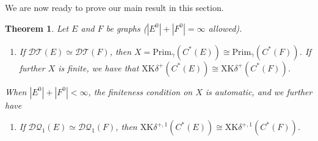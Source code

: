 \documentclass[12pt]{amsbook}%
\newcommand{\lt}{\operatorname{rt}}
\newtheorem{theor}{Theorem}[section]
\theoremstyle{defin}
\theoremstyle{remark}
\numberwithin{equation}{chapter}
\numberwithin{theor}{section}
\newcommand{\ZZ}{\mathbb{Z}}
\newcommand{\DT}{\mathcal{DT}}
\newcommand{\DQp}{\mathcal{DQ}_1}
\begin{document}
We are now ready to prove our main result in this section.

\begin{theor}\label{thm:graded-kthy-XKdelta}
Let $E$ and $F$ be graphs ($|E^0|+|F^0|=\infty$ allowed).
\begin{enumerate}[(1)]
\item If 
$\DT(E)\simeq \DT(F)$, 
then $X =  \mathrm{Prim}_\gamma ( C^*(E)) \cong \mathrm{Prim}_\gamma ( C^*(F))$. If further $X$ is finite, we have that $\mathrm{XK}\delta^+ ( C^*(E)) \cong \mathrm{XK} \delta^+ ( C^*(F))$.
\end{enumerate}
When  $|E^0|+|F^0|<\infty$, the finiteness condition on $X$ is automatic, and  we further have 
\begin{enumerate}[(1)]\addtocounter{enumi}{1}
\item  If $\DQp(E)\simeq \DQp(F)$,  then $\mathrm{XK}\delta^{+,1} ( C^*(E)) \cong \mathrm{XK} \delta^{+,1} (C^*(F))$.
\end{enumerate}
\end{theor}
\end{document}
